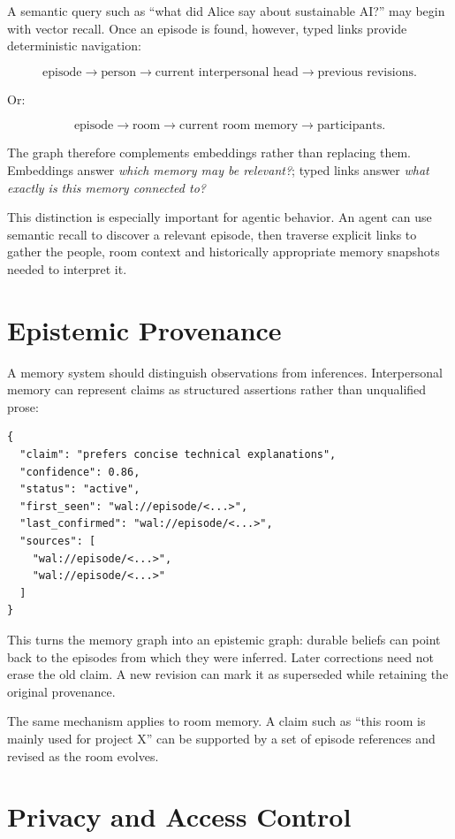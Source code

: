 \documentclass[11pt]{article}
\begin{document}
A semantic query such as ``what did Alice say about sustainable AI?'' may begin with vector recall. Once an episode is found, however, typed links provide deterministic navigation:

\[
\text{episode}
\rightarrow \text{person}
\rightarrow \text{current interpersonal head}
\rightarrow \text{previous revisions}.
\]

Or:

\[
\text{episode}
\rightarrow \text{room}
\rightarrow \text{current room memory}
\rightarrow \text{participants}.
\]

The graph therefore complements embeddings rather than replacing them. Embeddings answer \emph{which memory may be relevant?}; typed links answer \emph{what exactly is this memory connected to?}

This distinction is especially important for agentic behavior. An agent can use semantic recall to discover a relevant episode, then traverse explicit links to gather the people, room context and historically appropriate memory snapshots needed to interpret it.

\section{Epistemic Provenance}

A memory system should distinguish observations from inferences. Interpersonal memory can represent claims as structured assertions rather than unqualified prose:

\begin{lstlisting}
{
  "claim": "prefers concise technical explanations",
  "confidence": 0.86,
  "status": "active",
  "first_seen": "wal://episode/<...>",
  "last_confirmed": "wal://episode/<...>",
  "sources": [
    "wal://episode/<...>",
    "wal://episode/<...>"
  ]
}
\end{lstlisting}

This turns the memory graph into an epistemic graph: durable beliefs can point back to the episodes from which they were inferred. Later corrections need not erase the old claim. A new revision can mark it as superseded while retaining the original provenance.

The same mechanism applies to room memory. A claim such as ``this room is mainly used for project X'' can be supported by a set of episode references and revised as the room evolves.

\section{Privacy and Access Control}
\end{document}
